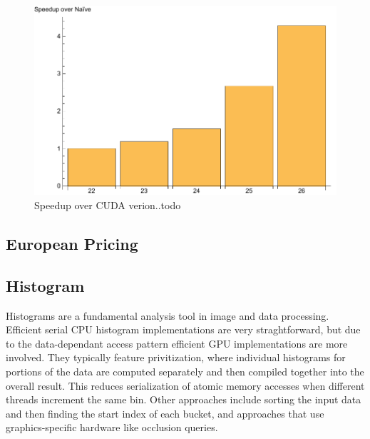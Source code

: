 \begin{figure}
\centering
\includegraphics[scale=0.5]{data/blackscholes.pdf}
\caption{Speedup over CUDA verion..todo}
\label{fig:blackscholes}
\centering
\end{figure}


\subsection{European Pricing}


\subsection{Histogram}
Histograms are a fundamental analysis tool in image and data processing.
Efficient serial CPU histogram implementations are very straghtforward, but
due to the data-dependant access pattern efficient GPU implementations are
more involved. They typically feature privitization,
where individual histograms for portions of the data are computed separately
and then compiled together into the overall result. This reduces serialization
of atomic memory accesses when different threads increment the same bin.
Other approaches include sorting the input data and then finding the start
index of each bucket, and approaches that use graphics-specific hardware like
occlusion queries.

